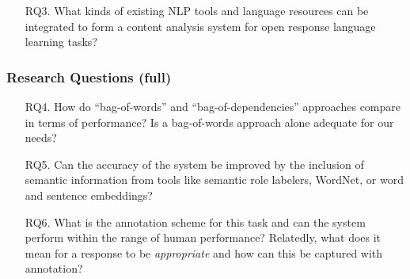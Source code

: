 \documentclass[handout,xcolor={dvipsnames}]{beamer}
\begin{document}
\begin{frame}
\begin{itemize}
\pause
\vspace{2em}
\item[RQ3.]{What kinds of existing NLP tools and language resources can be integrated to form a content analysis system for open response language learning tasks?}
\end{itemize}
\end{frame}

\begin{frame}
\frametitle{Research Questions (full)}
\small
\begin{itemize}
\pause
\item[RQ4.]{How do ``bag-of-words'' and ``bag-of-dependencies'' approaches compare in terms of performance? Is a bag-of-words approach alone adequate for our needs?}
\pause
\vspace{2em}
\item[RQ5.]{Can the accuracy of the system be improved by the inclusion of semantic information from tools like semantic role labelers, WordNet, or word and sentence embeddings?}

\pause
\vspace{2em}
\item[RQ6.]{What is the annotation scheme for this task and can the system perform within the range of human performance? Relatedly, what does it mean for a response to be \textit{appropriate} and how can this be captured with annotation?}
\end{itemize}
\end{frame}
\end{document}
